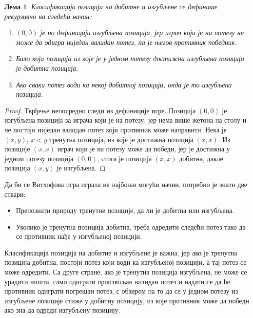 \documentclass[a4paper]{article}
\newtheorem{lemma}{Лема}
\begin{document}
\begin{lemma}
	Класификација позиција на добитне и изгубљене се дефинише рекурзивно на следећи начин:
		\begin{enumerate}
			\item $ (0, 0) $ је по дефиницији изгубљена позиција, јер играч који је на потезу не може да одигра ниједан валидан потез, па је његов противник победник.
			\item Било која позиција из које је у једном потезу достижна изгубљена позиција је добитна позиција.
			\item Ако сваки потез води ка некој добитној позицији, онда је то изгубљена позиција.
		\end{enumerate}	
\end{lemma}

\begin{proof}
	Тврђење непосредно следи из дефиниције игре. Позиција $ (0, 0) $ је изгубљена позиција за играча који је на потезу, јер нема више жетона на столу и не постоји ниједан валидан потез који противник може направити. 
	Нека је $ (x, y) $, $ x < y $ тренутна позиција, из које је достижна позиција $ (x, x) $. Из позиције $ (x, x) $ играч који је на потезу може да победи, јер је достижна у једном потезу позиција $ (0, 0) $, стога је позиција $ (x, x) $ добитна, дакле позиција $ (x, y) $ је изгубљена. 
\end{proof}

Да би се Витхофова игра играла на најбољи могући начин, потребно је знати две ствари:
\begin{itemize}
	\item Препознати природу тренутне позиције, да ли је добитна или изгубљена.
	\item Уколико је тренутна позиција добитна, треба одредити следећи потез тако да се противник нађе у изгубљеној позицији.
\end{itemize}

Класификација позиција на добитне и изгубљене је важна, јер ако је тренутна позиција добитна, постоји потез који води ка изгубљеној позицији, а тај потез се може одредити. Са друге стране, ако је тренутна позиција изгубљена, не може се урадити ништа, само одиграти произвољан валидан потез и надати се да ће противник одиграти погрешан потез, с обзиром на то да се у једном потезу из изгубљене позиције стиже у добитну позицију, из које противник може да победи ако зна да одреди изгубљену позицију. 
\end{document}
